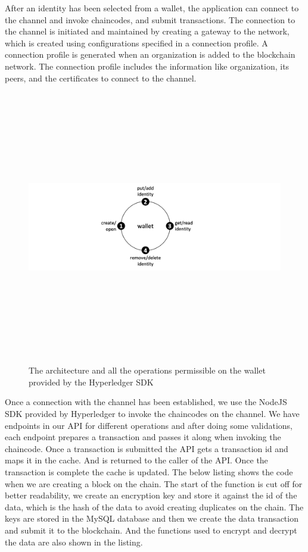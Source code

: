 \bigskip
After an identity has been selected from a wallet, the application can connect to the channel and invoke chaincodes, and submit transactions. The connection to the channel is initiated and maintained by creating a gateway to the network, which is created using configurations specified in a connection profile. A connection profile is generated when an organization is added to the blockchain network. The connection profile includes the information like organization, its peers, and the certificates to connect to the channel.

\begin{figure}
    \centering
    \includegraphics[width=12cm,height=12cm,keepaspectratio]{photos/wallet.png}
    \caption{The architecture and all the operations permissible on the wallet provided by the Hyperledger SDK}
    \label{fig:hyperledger-wallet}
\end{figure}

\bigskip
Once a connection with the channel has been established, we use the NodeJS SDK provided by Hyperledger to invoke the chaincodes on the channel. We have endpoints in our API for different operations and after doing some validations, each endpoint prepares a transaction and passes it along when invoking the chaincode. Once a transaction is submitted the API gets a transaction id and maps it in the cache. And is returned to the caller of the API. Once the transaction is complete the cache is updated. The below listing shows the code when we are creating a block on the chain. The start of the function is cut off for better readability, we create an encryption key and store it against the id of the data, which is the hash of the data to avoid creating duplicates on the chain. The keys are stored in the MySQL database and then we create the data transaction and submit it to the blockchain. And the functions used to encrypt and decrypt the data are also shown in the listing.

